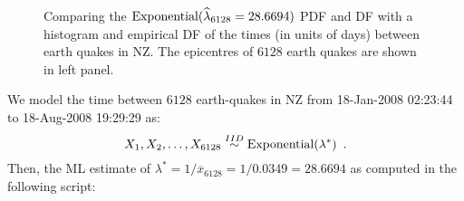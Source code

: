 {%
\begin{figure}[htpb]
\caption{Comparing the $\mbox{{\rm Exponential}}(\widehat{\lambda}_{6128}= 28.6694)$ PDF and DF with a histogram and empirical DF of the times (in units of days) between earth quakes in  NZ.  The epicentres of $6128$ earth quakes are shown in left panel.\label{F:NZSIEarthQuakesExponentialMLE}}
\centering   {}
\end{figure}
\begin{labwork}\label{LW:NZSIEarthQuakesExponentialMLE}  
We model the time between $6128$ earth-quakes in NZ from 18-Jan-2008 02:23:44 to 18-Aug-2008 19:29:29 as:
\[
X_1,X_2,\ldots,X_{6128} \overset{IID}{\sim} \mbox{{\rm Exponential}}(\lambda^*) \enspace .
\]
Then, the ML estimate of $\lambda^* = 1/\overline{x}_{6128} = 1/0.0349=28.6694$ as computed in the following script:


\end{labwork}}
